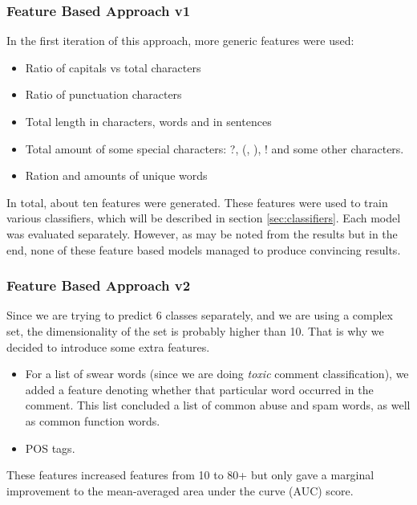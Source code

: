 \documentclass[10pt, a4paper]{article}
\begin{document}
\begin{multicols}{2}
		\subsubsection{Feature Based Approach v1}
		In the first iteration of this approach, more generic features were used:
		\begin{itemize}
			\setlength\itemsep{0px}
			\item Ratio of capitals vs total characters
			\item Ratio of punctuation characters
			\item Total length in characters, words and in sentences
			\item Total amount of some special characters: ?, (, ), ! and some other characters.
			\item Ration and amounts of unique words		
		\end{itemize}
		In total, about ten features were generated. These features were used to train various classifiers, which will be described in section \ref{sec:classifiers}. Each model was evaluated separately. However, as may be noted from the results but in the end, none of these feature based models managed to produce convincing results.
		
		
		\subsubsection{Feature Based Approach v2}
		
		
		Since we are trying to predict 6 classes separately, and we are using a  complex set, the dimensionality of the set is probably higher than 10. That is why we decided to introduce some extra features.
		
		\begin{itemize}
			\item For a list of swear words (since we are doing \emph{toxic} comment classification), we added a feature denoting whether that particular word occurred in the comment. This list concluded a list of common abuse and spam words, as well as common function words.
			\item  POS tags.
		\end{itemize}
		
		These features increased features from 10 to 80+ but only gave a marginal improvement to the mean-averaged area under the curve (AUC) score.
		

\end{multicols}
\end{document}

